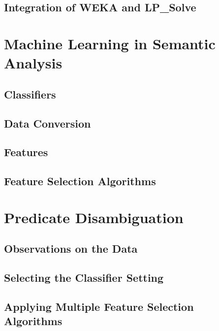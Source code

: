 \documentclass[12pt,notitlepage]{report}
\begin{document}
\section{Integration of WEKA and LP\_Solve}

\chapter{Machine Learning in Semantic Analysis}\label{ml-semantic}
\section{Classifiers}\label{classifiers}
\section{Data Conversion}\label{conversion}
\section{Features}
\section{Feature Selection Algorithms}

\chapter{Predicate Disambiguation}\label{pd}
\section{Observations on the Data}
\section{Selecting the Classifier Setting}\label{classifier-setting}
\section{Applying Multiple Feature Selection Algorithms}
\end{document}
